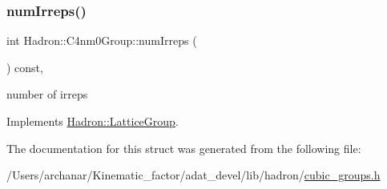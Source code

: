 \subsubsection{\texorpdfstring{numIrreps()}{numIrreps()}\hspace{0.1cm}{\footnotesize\ttfamily [2/2]}}
{\footnotesize\ttfamily int Hadron\+::\+C4nm0\+Group\+::num\+Irreps (\begin{DoxyParamCaption}{ }\end{DoxyParamCaption}) const\hspace{0.3cm}{\ttfamily [inline]}, {\ttfamily [virtual]}}

number of irreps 

Implements \mbox{\hyperlink{structHadron_1_1LatticeGroup_a3edaca488144b5d2a9cf73fe653add34}{Hadron\+::\+Lattice\+Group}}.



The documentation for this struct was generated from the following file\+:\begin{DoxyCompactItemize}
\item 
/\+Users/archanar/\+Kinematic\+\_\+factor/adat\+\_\+devel/lib/hadron/\mbox{\hyperlink{lib_2hadron_2cubic__groups_8h}{cubic\+\_\+groups.\+h}}\end{DoxyCompactItemize}
